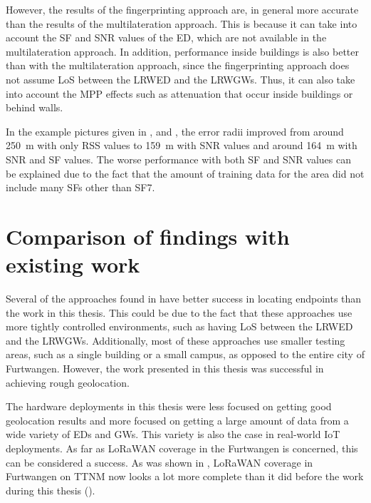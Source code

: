 However, the results of the fingerprinting approach are, in general more accurate than the results of the multilateration approach.
This is because it can take into account the \ac{SF} and \ac{SNR} values of the \acl{ED}, which are not available in the multilateration approach.
In addition, performance inside buildings is also better than with the multilateration approach, since the fingerprinting approach does not assume \ac{LoS} between the \acl{LRWED} and the \aclp{LRWGW}.
Thus, it can also take into account the \ac{MPP} effects such as attenuation that occur inside buildings or behind walls.

In the example pictures given in ,  and , the error radii improved from around \SI{250}{\meter} with only \ac{RSS} values to \SI{159}{\meter} with \ac{SNR} values and around \SI{164}{\meter} with \ac{SNR} and \ac{SF} values.
The worse performance with both \ac{SF} and \ac{SNR} values can be explained due to the fact that the amount of training data for the area did not include many \aclp{SF} other than \acs{SF}7.

\section{Comparison of findings with existing work}

Several of the approaches found in  have better success in locating endpoints than the work in this thesis.
This could be due to the fact that these approaches use more tightly controlled environments, such as having \ac{LoS} between the \acl{LRWED} and the \aclp{LRWGW}.
Additionally, most of these approaches use smaller testing areas, such as a single building or a small campus, as opposed to the entire city of Furtwangen.
However, the work presented in this thesis was successful in achieving rough geolocation.

The hardware deployments in this thesis were less focused on getting good geolocation results and more focused on getting a large amount of data from a wide variety of \aclp{ED} and \aclp{GW}.
This variety is also the case in real-world \ac{IoT} deployments.
As far as \ac{LoRaWAN} coverage in the Furtwangen is concerned, this can be considered a success.
As was shown in , \ac{LoRaWAN} coverage in Furtwangen on \ac{TTNM} now looks a lot more complete than it did before the work during this thesis ().

